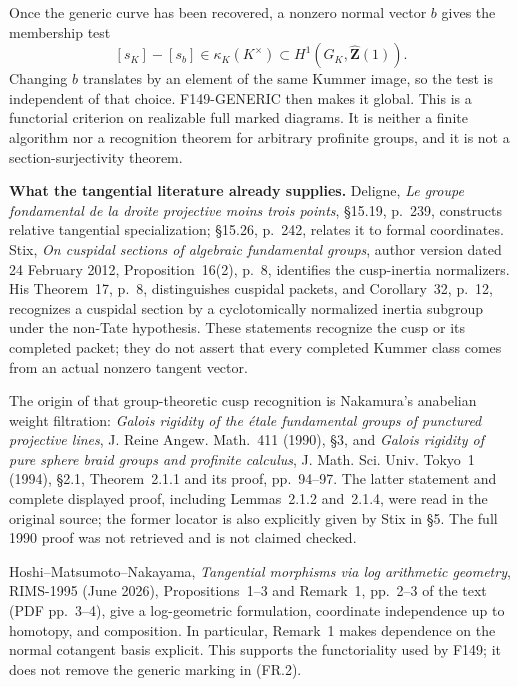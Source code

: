 \documentclass[11pt,a4paper]{article}
\theoremstyle{definition}
\renewcommand{\paragraph}[1]{\par\smallskip\noindent\textbf{#1}\quad\ignorespaces}
\begin{document}
Once the generic curve has been recovered, a nonzero normal
vector $b$ gives the membership test
\[
 [s_K]-[s_b]\in\kappa_K(K^\times)
       \subset H^1(G_K,\widehat{\mathbf Z}(1)).             \tag{FR.2}
\]
Changing $b$ translates by an element of the same Kummer
image, so the test is independent of that choice. F149-GENERIC
then makes it global. This is a functorial criterion on
realizable full marked diagrams. It is neither a finite
algorithm nor a recognition theorem for arbitrary profinite
groups, and it is not a section-surjectivity theorem.

\paragraph{What the tangential literature already supplies.}
Deligne, \emph{Le groupe fondamental de la droite projective
moins trois points}, \S15.19, p.~239, constructs relative
tangential specialization; \S15.26, p.~242, relates it to
formal coordinates. Stix, \emph{On cuspidal sections of
algebraic fundamental groups}, author version dated
24 February 2012, Proposition~16(2), p.~8, identifies the
cusp-inertia normalizers. His Theorem~17, p.~8, distinguishes
cuspidal packets, and Corollary~32, p.~12, recognizes a
cuspidal section by a cyclotomically normalized inertia
subgroup under the non-Tate hypothesis. These statements
recognize the cusp or its completed packet; they do not
assert that every completed Kummer class comes from an
actual nonzero tangent vector.

The origin of that group-theoretic cusp recognition is
Nakamura's anabelian weight filtration: \emph{Galois rigidity
of the \'etale fundamental groups of punctured projective
lines}, J. Reine Angew. Math.~411 (1990), \S3, and
\emph{Galois rigidity of pure sphere braid groups and
profinite calculus}, J. Math. Sci. Univ. Tokyo~1 (1994),
\S2.1, Theorem~2.1.1 and its proof, pp.~94--97. The latter
statement and complete displayed proof, including
Lemmas~2.1.2 and~2.1.4, were read in the original source;
the former locator is also explicitly given by Stix in \S5. The full
1990 proof was not retrieved and is not claimed checked.

Hoshi--Matsumoto--Nakayama, \emph{Tangential morphisms via
log arithmetic geometry}, RIMS-1995 (June 2026),
Propositions~1--3 and Remark~1, pp.~2--3 of the text
(PDF pp.~3--4), give a log-geometric formulation, coordinate
independence up to homotopy, and composition. In particular,
Remark~1 makes dependence on the normal cotangent basis
explicit. This supports the functoriality used by F149; it
does not remove the generic marking in (FR.2).
\end{document}
